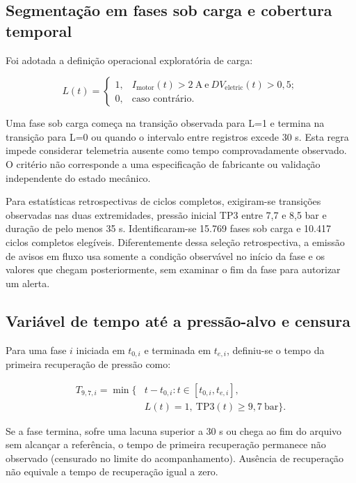 \documentclass[conference]{IEEEtran}
\begin{document}
\subsection{Segmentação em fases sob carga e cobertura temporal}

Foi adotada a definição operacional exploratória de carga:

\begin{equation}\label{eq:estado}L(t)=\begin{cases}1,&I_{\mathrm{motor}}(t)>2\ \mathrm{A}\ \mathrm{e}\ DV_{\mathrm{eletric}}(t)>0{,}5;\\0,&\text{caso contrário.}\end{cases}\end{equation}

Uma fase sob carga começa na transição observada para L=1 e termina na transição para L=0 ou quando o intervalo entre registros excede 30 s. Esta regra impede considerar telemetria ausente como tempo comprovadamente observado. O critério não corresponde a uma especificação de fabricante ou validação independente do estado mecânico.

Para estatísticas retrospectivas de ciclos completos, exigiram-se transições observadas nas duas extremidades, pressão inicial TP3 entre 7,7 e 8,5 bar e duração de pelo menos 35 s. Identificaram-se 15.769 fases sob carga e 10.417 ciclos completos elegíveis. Diferentemente dessa seleção retrospectiva, a emissão de avisos em fluxo usa somente a condição observável no início da fase e os valores que chegam posteriormente, sem examinar o fim da fase para autorizar um alerta.

\subsection{Variável de tempo até a pressão-alvo e censura}

Para uma fase $i$ iniciada em $t_{0,i}$ e terminada em $t_{e,i}$, definiu-se o tempo da primeira recuperação de pressão como:

\begin{equation}\label{eq:recuperacao}\begin{aligned}T_{9{,}7,i}=\min\bigl\{&t-t_{0,i}:t\in[t_{0,i},t_{e,i}],\\&L(t)=1,\ \mathrm{TP3}(t)\geq 9{,}7\ \mathrm{bar}\bigr\}.\end{aligned}\end{equation}

Se a fase termina, sofre uma lacuna superior a 30 s ou chega ao fim do arquivo sem alcançar a referência, o tempo de primeira recuperação permanece não observado (censurado no limite do acompanhamento). Ausência de recuperação não equivale a tempo de recuperação igual a zero.
\end{document}
